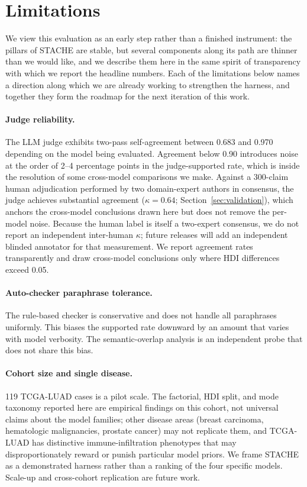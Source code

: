 \documentclass[11pt]{article}
\begin{document}
\section*{Limitations}
\label{sec:limitations}

We view this evaluation as an early step rather than a finished instrument: the pillars of STACHE are stable, but several components along its path are thinner than we would like, and we describe them here in the same spirit of transparency with which we report the headline numbers. Each of the limitations below names a direction along which we are already working to strengthen the harness, and together they form the roadmap for the next iteration of this work.

\paragraph{Judge reliability.} The LLM judge exhibits two-pass self-agreement between 0.683 and 0.970 depending on the model being evaluated. Agreement below 0.90 introduces noise at the order of 2--4 percentage points in the judge-supported rate, which is inside the resolution of some cross-model comparisons we make. Against a 300-claim human adjudication performed by two domain-expert authors in consensus, the judge achieves substantial agreement ($\kappa = 0.64$; Section~\ref{sec:validation}), which anchors the cross-model conclusions drawn here but does not remove the per-model noise. Because the human label is itself a two-expert consensus, we do not report an independent inter-human $\kappa$; future releases will add an independent blinded annotator for that measurement. We report agreement rates transparently and draw cross-model conclusions only where HDI differences exceed 0.05.

\paragraph{Auto-checker paraphrase tolerance.} The rule-based checker is conservative and does not handle all paraphrases uniformly. This biases the supported rate downward by an amount that varies with model verbosity. The semantic-overlap analysis is an independent probe that does not share this bias.

\paragraph{Cohort size and single disease.} 119 TCGA-LUAD cases is a pilot scale. The factorial, HDI split, and mode taxonomy reported here are empirical findings on this cohort, not universal claims about the model families; other disease areas (breast carcinoma, hematologic malignancies, prostate cancer) may not replicate them, and TCGA-LUAD has distinctive immune-infiltration phenotypes that may disproportionately reward or punish particular model priors. We frame STACHE as a demonstrated harness rather than a ranking of the four specific models. Scale-up and cross-cohort replication are future work.
\end{document}
